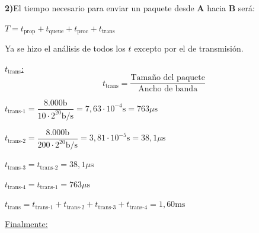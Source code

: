 \skipline
\skipline
\noindent
\textbf{2)}\tab El tiempo necesario para enviar un paquete desde \textbf{A} hacia \textbf{B} será:

\vspace{0.5\baselineskip}
\hfil
{\large
$T =
t_{\text{prop}} + t_{\text{queue}} + t_{\text{proc}} + t_{\text{trans}}$
}
\hfil

\vspace{0.5\baselineskip}
Ya se hizo el análisis de todos los $t$ excepto por el de transmisión.


\skipline
{
\noindent\large
\underline{$t_{\text{trans}}$:}
}
$$t_{\text{trans}} = \dfrac{\text{Tamaño del paquete}}{\text{Ancho de banda}}$$

\vspace{0.5\baselineskip}
$t_{\text{trans-1}} =
\dfrac{8.000\text{b}}{10 \cdot 2^{20} \text{b}/\text{s}} =
7,63\cdot 10^{-4} \text{s} =
763 \mu\text{s}
$

\vspace{0.5\baselineskip}
$t_{\text{trans-2}} =
\dfrac{8.000\text{b}}{200 \cdot 2^{20} \text{b}/\text{s}} =
3,81\cdot 10^{-5} \text{s} =
38,1 \mu\text{s}
$

\vspace{0.5\baselineskip}
$t_{\text{trans-3}} =
t_{\text{trans-2}} =
38,1 \mu\text{s}
$

\vspace{0.5\baselineskip}
$t_{\text{trans-4}} =
t_{\text{trans-1}} =
763 \mu\text{s}
$

\vspace{\baselineskip}
$t_{\text{trans}} =
t_{\text{trans-1}} + t_{\text{trans-2}} + t_{\text{trans-3}} + t_{\text{trans-4}} = 1,60 \text{ms}
$

\skipline
\noindent
\underline{Finalmente:}

\vspace{0.5\baselineskip}
\hfil
{\large
{}
}
\hfil